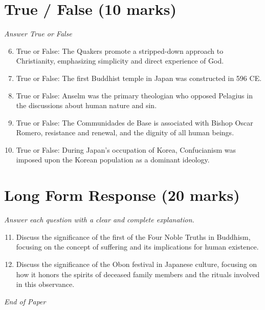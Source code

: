 \documentclass[12pt]{article}
\begin{document}
\section*{True / False (10 marks)}
\textit{Answer True or False}
\begin{enumerate}[label=\arabic*.]
\setcounter{enumi}{5}
\item True or False: The Quakers promote a stripped-down approach to Christianity, emphasizing simplicity and direct experience of God.
\item True or False: The first Buddhist temple in Japan was constructed in 596 CE.
\item True or False: Anselm was the primary theologian who opposed Pelagius in the discussions about human nature and sin.
\item True or False: The Communidades de Base is associated with Bishop Oscar Romero, resistance and renewal, and the dignity of all human beings.
\item True or False: During Japan's occupation of Korea, Confucianism was imposed upon the Korean population as a dominant ideology.
\end{enumerate}

\section*{Long Form Response (20 marks)}
\textit{Answer each question with a clear and complete explanation.}
\begin{enumerate}[label=\arabic*.]
\setcounter{enumi}{10}
\item Discuss the significance of the first of the Four Noble Truths in Buddhism, focusing on the concept of suffering and its implications for human existence.
\item Discuss the significance of the Obon festival in Japanese culture, focusing on how it honors the spirits of deceased family members and the rituals involved in this observance.
\end{enumerate}

\vfill
\noindent\textit{End of Paper}
\end{document}
